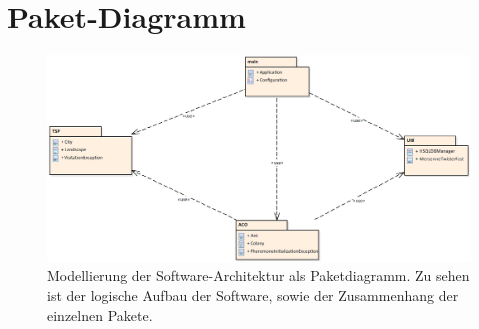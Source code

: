 \section{Paket-Diagramm}{
	\begin{figure}
		\centering
		\includegraphics[width=0.9\linewidth]{images/packageModel.png}
		\caption{Modellierung der Software-Architektur als Paketdiagramm. Zu sehen ist der logische Aufbau der Software, sowie der Zusammenhang der einzelnen Pakete.}
	\end{figure}
	
}